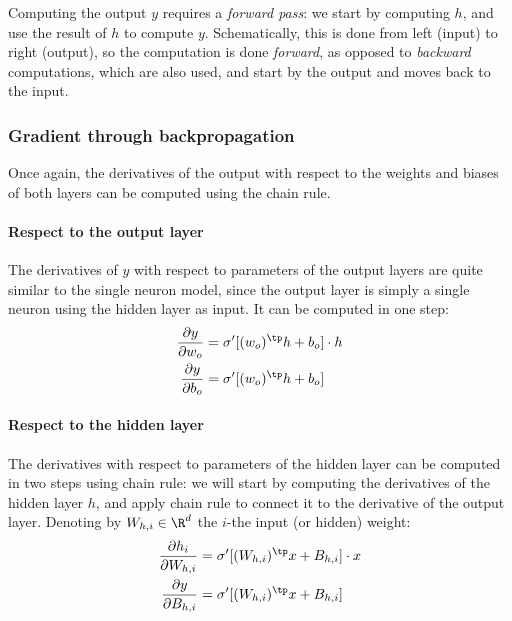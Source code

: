 \documentclass[toc, titlepaged]{../cs-classes/cs-classes}
\begin{document}
Computing the output $y$ requires a \emph{forward pass}: we start by computing $h$, and use the result of $h$ to compute $y$. Schematically, this is done from left (input) to right (output), so the computation is done \emph{forward}, as opposed to \emph{backward} computations, which are also used, and start by the output and moves back to the input.

\subsubsection{Gradient through backpropagation}
Once again, the derivatives of the output with respect to the weights and biases of both layers can be computed using the chain rule.

\paragraph*{Respect to the output layer}
The derivatives of $y$ with respect to parameters of the output layers are quite similar to the single neuron model, since the output layer is simply a single neuron using the hidden layer as input. It can be computed in one step:
\begin{equation*}
    \begin{aligned}
        \frac{\partial y}{\partial w_o} &= \sigma'[(w_o)^\tp h + b_o]\cdot h\\
        \frac{\partial y}{\partial b_o} &= \sigma'[(w_o)^\tp h + b_o]
    \end{aligned}
\end{equation*}

\paragraph*{Respect to the hidden layer}
The derivatives with respect to parameters of the hidden layer can be computed in two steps using chain rule: we will start by computing the derivatives of the hidden layer $h$, and apply chain rule to connect it to the derivative of the output layer.
Denoting by $W_{h, i}\in\R^d$ the $i$-the input (or hidden) weight:
\begin{equation*}
    \begin{aligned}
        \frac{\partial h_i}{\partial W_{h, i}} &= \sigma'[(W_{h, i})^\tp x + B_{h, i}]\cdot x\\
        \frac{\partial y}{\partial B_{h, i}} &= \sigma'[(W_{h, i})^\tp x + B_{h, i}]
    \end{aligned}
\end{equation*}
\end{document}
